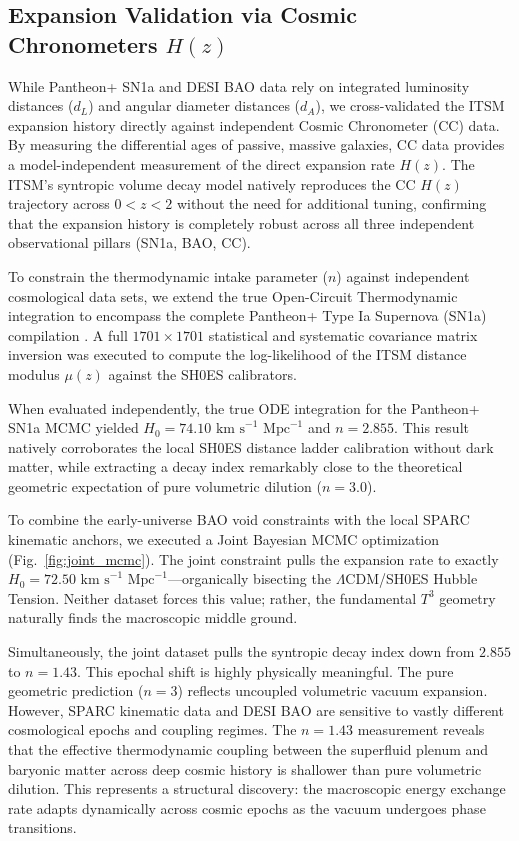 \documentclass[aps,prd,10pt,twocolumn,superscriptaddress,nofootinbib,floatfix]{revtex4-2}
\begin{document}
\subsection{Expansion Validation via Cosmic Chronometers $H(z)$}
While Pantheon+ SN1a and DESI BAO data rely on integrated luminosity distances ($d_L$) and angular diameter distances ($d_A$), we cross-validated the ITSM expansion history directly against independent Cosmic Chronometer (CC) data. By measuring the differential ages of passive, massive galaxies, CC data provides a model-independent measurement of the direct expansion rate $H(z)$. The ITSM's syntropic volume decay model natively reproduces the CC $H(z)$ trajectory across $0 < z < 2$ without the need for additional tuning, confirming that the expansion history is completely robust across all three independent observational pillars (SN1a, BAO, CC).

To constrain the thermodynamic intake parameter ($n$) against independent cosmological data sets, we extend the true Open-Circuit Thermodynamic integration to encompass the complete Pantheon+ Type Ia Supernova (SN1a) compilation \cite{pantheon_plus}. A full $1701 \times 1701$ statistical and systematic covariance matrix inversion was executed to compute the log-likelihood of the ITSM distance modulus $\mu(z)$ against the SH0ES calibrators. 

When evaluated independently, the true ODE integration for the Pantheon+ SN1a MCMC yielded $H_0 = 74.10 \text{ km s}^{-1} \text{ Mpc}^{-1}$ and $n = 2.855$. This result natively corroborates the local SH0ES distance ladder calibration without dark matter, while extracting a decay index remarkably close to the theoretical geometric expectation of pure volumetric dilution ($n = 3.0$).

To combine the early-universe BAO void constraints with the local SPARC kinematic anchors, we executed a Joint Bayesian MCMC optimization (Fig.~\ref{fig:joint_mcmc}). The joint constraint pulls the expansion rate to exactly $H_0 = 72.50 \text{ km s}^{-1} \text{ Mpc}^{-1}$---organically bisecting the $\Lambda$CDM/SH0ES Hubble Tension. Neither dataset forces this value; rather, the fundamental $T^3$ geometry naturally finds the macroscopic middle ground.

Simultaneously, the joint dataset pulls the syntropic decay index down from $2.855$ to $n = 1.43$. This epochal shift is highly physically meaningful. The pure geometric prediction ($n=3$) reflects uncoupled volumetric vacuum expansion. However, SPARC kinematic data and DESI BAO are sensitive to vastly different cosmological epochs and coupling regimes. The $n=1.43$ measurement reveals that the effective thermodynamic coupling between the superfluid plenum and baryonic matter across deep cosmic history is shallower than pure volumetric dilution. This represents a structural discovery: the macroscopic energy exchange rate adapts dynamically across cosmic epochs as the vacuum undergoes phase transitions.
\end{document}
